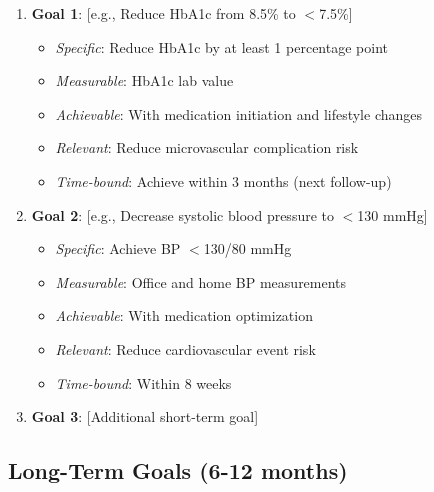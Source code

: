 \documentclass[11pt,letterpaper]{article}
\begin{document}
\begin{enumerate}[leftmargin=*]
    \item \textbf{Goal 1}: [e.g., Reduce HbA1c from 8.5\% to $<$7.5\%]
    \begin{itemize}
        \item \textit{Specific}: Reduce HbA1c by at least 1 percentage point
        \item \textit{Measurable}: HbA1c lab value
        \item \textit{Achievable}: With medication initiation and lifestyle changes
        \item \textit{Relevant}: Reduce microvascular complication risk
        \item \textit{Time-bound}: Achieve within 3 months (next follow-up)
    \end{itemize}

    \item \textbf{Goal 2}: [e.g., Decrease systolic blood pressure to $<$130 mmHg]
    \begin{itemize}
        \item \textit{Specific}: Achieve BP $<$130/80 mmHg
        \item \textit{Measurable}: Office and home BP measurements
        \item \textit{Achievable}: With medication optimization
        \item \textit{Relevant}: Reduce cardiovascular event risk
        \item \textit{Time-bound}: Within 8 weeks
    \end{itemize}

    \item \textbf{Goal 3}: [Additional short-term goal]
\end{enumerate}

\subsection*{Long-Term Goals (6-12 months)}
\end{document}
